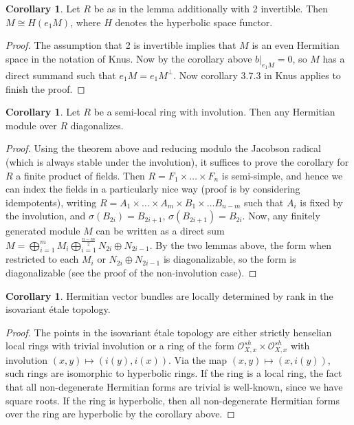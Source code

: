 \documentclass[edeposit,fullpage]{uiucthesis2009}
\newcommand{\mc}{\mathcal}
\theoremstyle{plain}
\numberwithin{lemma}{section}
\theoremstyle{definition}
\newtheorem{corollary}[lemma]{Corollary}
\begin{document}
\begin{corollary} \label{HermFormsOverSwitch} 
Let $R$ be as in the lemma additionally with 2 invertible. Then $M \cong H(e_1M)$, where $H$ denotes
the hyperbolic space functor. 
\end{corollary}

\begin{proof}
The assumption that 2 is invertible implies that $M$ is an even
Hermitian space in the notation of Knus. Now by the corollary above
$b|_{e_1M} = 0$, so $M$ has a direct summand such that $e_1M =
e_1M^{\perp}$. Now corollary 3.7.3 in Knus applies to finish the proof.
\end{proof}

\begin{corollary}
Let $R$ be a semi-local ring with involution. Then any Hermitian
module over $R$ diagonalizes.
\end{corollary}

\begin{proof}
Using the theorem above and reducing modulo the Jacobson radical
(which is always stable under the involution), it
suffices to prove the corollary for $R$ a finite product of
fields. Then $R = F_1 \times \dots \times F_n$ is semi-simple, and
hence we can index the fields in a particularly nice way (proof is by
considering idempotents), writing $R = A_1 \times \dots \times A_m \times B_1 \times
\dots B_{n-m}$ such that $A_i$ is fixed by the involution, and
$\sigma(B_{2i}) = B_{2i+1}$, $\sigma(B_{2i+1}) = B_{2i}$. Now, any
finitely generated module $M$ can be written as a direct sum $M =
\bigoplus_{i=1}^m M_i \bigoplus_{i=1}^{\frac{n-m}{2}} N_{2i} \oplus
N_{2i-1}$. By the two lemmas above, the form when restricted to each
$M_i$ or $N_{2i} \oplus N_{2i-1}$ is diagonalizable, so the form is
diagonalizable (see the proof of the non-involution case).   
\end{proof}


\begin{corollary}\label{cor:loc_det_rank}
Hermitian vector bundles are locally determined by rank in the isovariant \'etale topology.
\end{corollary}

\begin{proof}
The points in the isovariant \'etale topology are either strictly
henselian local rings with
trivial involution or a ring of the form $\mc O_{X,x}^{sh} \times \mc
O_{X,x}^{sh}$ with involution $(x,y) \mapsto (i(y),i(x))$. Via the map
$(x,y) \mapsto (x,i(y))$, such rings are isomorphic to hyperbolic rings. If the ring is a local ring, the fact that all non-degenerate Hermitian
forms are trivial is well-known, since we have square roots. If the
ring is hyperbolic, then all non-degenerate Hermitian forms over the
ring are hyperbolic by the corollary above.
\end{proof}
\end{document}

